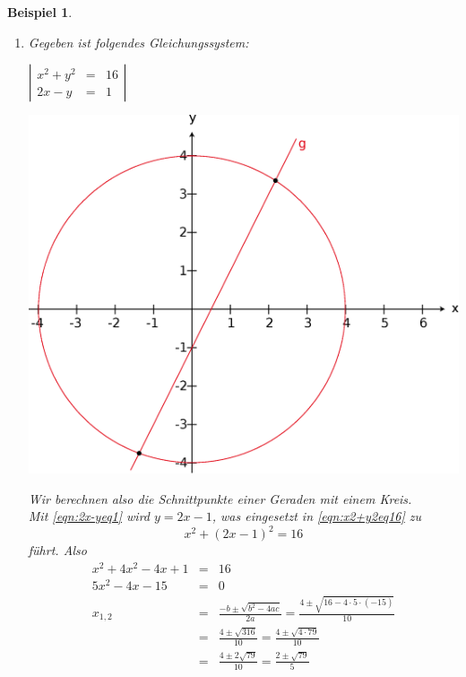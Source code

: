 \documentclass{report}
\newtheorem{myexample}{Beispiel}
\begin{document}
\begin{myexample}
\begin{enumerate}
\begin{enumerate}
\begin{eqnarray}
y & = & -\frac{11}{2}\end{eqnarray}
und so ist $L = \{(\frac{11}{5} / -\frac{11}{2})\}$
\item Gegeben ist folgendes Gleichungssystem:
\begin{center}$\left|\begin{array}{rcr}x^2 + y^2 & = & 16\label{eqn:x2+y2eq16} \\ 2x -y & = & 1\label{eqn:2x-yeq1}\end{array}\right|$\end{center}
\begin{center}\includegraphics[scale=0.25]{img/2_5-circle-cart-grid.eps}\end{center}
Wir berechnen also die Schnittpunkte einer Geraden mit einem Kreis.\\
Mit \ref{eqn:2x-yeq1} wird $y=2x-1$, was eingesetzt in \ref{eqn:x2+y2eq16} zu
\begin{equation}x^2 + (2x-1)^2 = 16\end{equation}
führt. Also
\begin{eqnarray}x^2 + 4x^2 - 4x + 1 & = & 16\nonumber \\
5x^2 - 4x -15 & = & 0\nonumber \\
x_{1,2} & = & \frac{-b \pm \sqrt{b^2 - 4ac}}{2a} = \frac{4 \pm \sqrt{16 - 4 \cdot 5 \cdot (-15)}}{10}\nonumber \\
&=& \frac{4 \pm \sqrt{316}}{10} = \frac{4 \pm \sqrt{4 \cdot 79}}{10}\nonumber \\
&=& \frac{4 \pm 2 \sqrt{79}}{10} = \frac{2 \pm \sqrt{79}}{5}\end{eqnarray}

\end{enumerate}
\end{enumerate}
\end{myexample}
\end{document}
